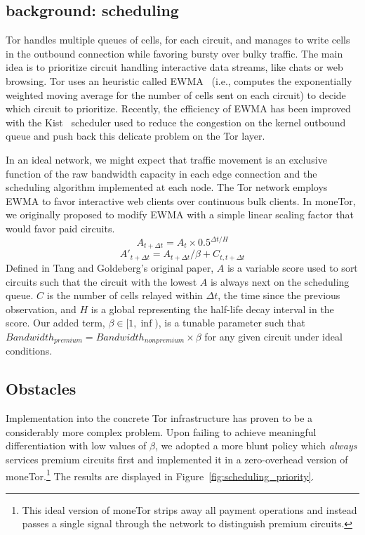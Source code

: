 \label{sec:scheduling}
\subsection{background: scheduling}

Tor handles multiple queues of cells, for each circuit, and manages to write
cells in the outbound connection while favoring bursty over bulky traffic. The
main idea is to prioritize circuit handling interactive data streams, like chats
or web browsing. Tor uses an heuristic called EWMA~\cite{tang2010improved}
(i.e., computes the exponentially weighted moving average for the number of
cells sent on each circuit) to decide which circuit to prioritize. Recently, the
efficiency of EWMA has been improved with the Kist~\cite{jansen2014never}
scheduler used to reduce the congestion on the kernel outbound queue and push
back this delicate problem on the Tor layer.

In an ideal network, we might expect that traffic movement is an exclusive
function of the raw bandwidth capacity in each edge connection and the
scheduling algorithm implemented at each node.  The Tor network employs EWMA to
favor interactive web clients over continuous bulk clients. In moneTor, we
originally proposed to modify EWMA with a simple linear scaling factor that
would favor paid circuits.
\begin{equation}
  A_{t + \Delta t} = A_t \times 0.5^{\Delta t/H}
\end{equation}
\begin{equation}
  A'_{t + \Delta t} = A_{t + \Delta t} / \beta + C_{t, t + \Delta t}
\end{equation}
Defined in Tang and Goldeberg's original paper, $A$ is a variable score used to
sort circuits such that the circuit with the lowest $A$ is always next on the
scheduling queue. $C$ is the number of cells relayed within $\Delta t$, the time
since the previous observation, and $H$ is a global representing the half-life
decay interval in the score. Our added term, $\beta \in [1, \inf)$, is a tunable
parameter such that $Bandwidth_{premium} = Bandwidth_{nonpremium} \times \beta$
for any given circuit under ideal conditions.

\subsection{Obstacles}

Implementation into the concrete Tor infrastructure has proven to be a
considerably more complex problem. Upon failing to achieve meaningful
differentiation with low values of $\beta$, we adopted a more blunt policy which
\emph{always} services premium circuits first and implemented it in a
zero-overhead version of moneTor.\footnote{This ideal version of moneTor strips
  away all payment operations and instead passes a single signal through the
  network to distinguish premium circuits.} The results are displayed in
Figure~\ref{fig:scheduling_priority}.

